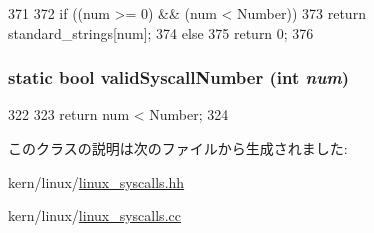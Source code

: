 \begin{DoxyCode}
371 {
372     if ((num >= 0) && (num < Number))
373         return standard_strings[num];
374     else
375         return 0;
376 }
\end{DoxyCode}
\hypertarget{classSystemCalls_3_01Linux_01_4_a16b77c15073fe4a4996b823f6e7a7096}{
\subsubsection[{validSyscallNumber}]{\setlength{\rightskip}{0pt plus 5cm}static bool validSyscallNumber (int {\em num})}}
\label{classSystemCalls_3_01Linux_01_4_a16b77c15073fe4a4996b823f6e7a7096}



\begin{DoxyCode}
322                                             {
323             return num < Number;
324     }
\end{DoxyCode}


このクラスの説明は次のファイルから生成されました:\begin{DoxyCompactItemize}
\item 
kern/linux/\hyperlink{linux__syscalls_8hh}{linux\_\-syscalls.hh}\item 
kern/linux/\hyperlink{linux__syscalls_8cc}{linux\_\-syscalls.cc}\end{DoxyCompactItemize}
